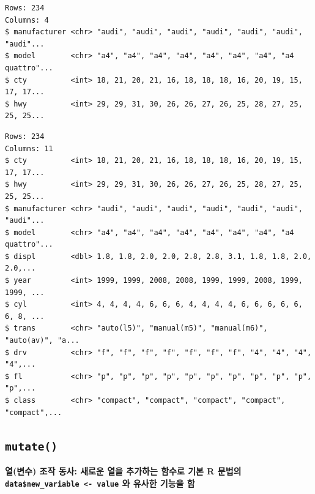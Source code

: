 \documentclass[
  11pt,
]{krantz}
\makeatletter
\newenvironment{Shaded}{\begin{snugshade}}{\end{snugshade}}
\newcommand{\CommentTok}[1]{\textcolor[rgb]{0.37,0.37,0.37}{\textit{#1}}}
\newcommand{\KeywordTok}[1]{\textcolor[rgb]{0.27,0.27,0.27}{\textbf{#1}}}
\newcommand{\NormalTok}[1]{#1}
\newcommand{\OperatorTok}[1]{\textcolor[rgb]{0.43,0.43,0.43}{\textbf{#1}}}
\newcommand{\StringTok}[1]{\textcolor[rgb]{0.5,0.5,0.5}{#1}}
\newenvironment{kframe}{%
\medskip{}
\setlength{\fboxsep}{.8em}
 \def\at@end@of@kframe{}%
 \ifinner\ifhmode%
  \def\at@end@of@kframe{\end{minipage}}%
  \begin{minipage}{\columnwidth}%
 \fi\fi%
 \def\FrameCommand##1{\hskip\@totalleftmargin \hskip-\fboxsep
 \colorbox{shadecolor}{##1}\hskip-\fboxsep
     \hskip-\linewidth \hskip-\@totalleftmargin \hskip\columnwidth}%
 \MakeFramed {\advance\hsize-\width
   \@totalleftmargin\z@ \linewidth\hsize
   \@setminipage}}%
 {\par\unskip\endMakeFramed%
 \at@end@of@kframe}
\renewenvironment{quote}{\begin{kframe}}{\end{kframe}}
\makeatother
\begin{document}
\begin{verbatim}
Rows: 234
Columns: 4
$ manufacturer <chr> "audi", "audi", "audi", "audi", "audi", "audi", "audi"...
$ model        <chr> "a4", "a4", "a4", "a4", "a4", "a4", "a4", "a4 quattro"...
$ cty          <int> 18, 21, 20, 21, 16, 18, 18, 18, 16, 20, 19, 15, 17, 17...
$ hwy          <int> 29, 29, 31, 30, 26, 26, 27, 26, 25, 28, 27, 25, 25, 25...
\end{verbatim}

\begin{Shaded}
\end{Shaded}

\begin{verbatim}
Rows: 234
Columns: 11
$ cty          <int> 18, 21, 20, 21, 16, 18, 18, 18, 16, 20, 19, 15, 17, 17...
$ hwy          <int> 29, 29, 31, 30, 26, 26, 27, 26, 25, 28, 27, 25, 25, 25...
$ manufacturer <chr> "audi", "audi", "audi", "audi", "audi", "audi", "audi"...
$ model        <chr> "a4", "a4", "a4", "a4", "a4", "a4", "a4", "a4 quattro"...
$ displ        <dbl> 1.8, 1.8, 2.0, 2.0, 2.8, 2.8, 3.1, 1.8, 1.8, 2.0, 2.0,...
$ year         <int> 1999, 1999, 2008, 2008, 1999, 1999, 2008, 1999, 1999, ...
$ cyl          <int> 4, 4, 4, 4, 6, 6, 6, 4, 4, 4, 4, 6, 6, 6, 6, 6, 6, 8, ...
$ trans        <chr> "auto(l5)", "manual(m5)", "manual(m6)", "auto(av)", "a...
$ drv          <chr> "f", "f", "f", "f", "f", "f", "f", "4", "4", "4", "4",...
$ fl           <chr> "p", "p", "p", "p", "p", "p", "p", "p", "p", "p", "p",...
$ class        <chr> "compact", "compact", "compact", "compact", "compact",...
\end{verbatim}

\normalsize

\hypertarget{dplyr-mutate}{%
\subsection{\texorpdfstring{\texttt{mutate()}}{mutate()}}\label{dplyr-mutate}}

\begin{quote}
\textbf{열(변수) 조작 동사: 새로운 열을 추가하는 함수로 기본 R 문법의 \texttt{data\$new\_variable\ \textless{}-\ value} 와 유사한 기능을 함}
\end{quote}
\end{document}
